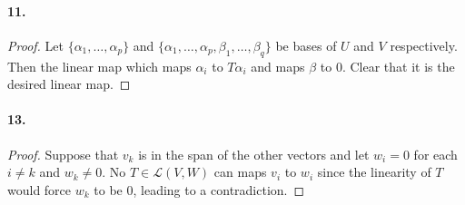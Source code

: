   \paragraph{11.}
  \begin{proof}
    Let $\{\alpha_1,\dots,\alpha_p\}$ and $\{\alpha_1,\dots,\alpha_p,\beta_1,
    \dots,\beta_q\}$ be bases of $U$ and $V$ respectively. Then the linear map 
    which maps $\alpha_i$ to $T\alpha_i$ and maps $\beta$ to $0$. Clear that
    it is the desired linear map. 
  \end{proof}

  \paragraph{13.}
  \begin{proof}
    Suppose that $v_k$ is in the span of the other vectors and let $w_i=0$ for 
    each $i\ne k$ and $w_k\ne 0$. No $T\in\mathcal{L}(V, W)$ can maps $v_i$ to 
    $w_i$ since the linearity of $T$ would force $w_k$ to be $0$, leading to a 
    contradiction.
  \end{proof}

